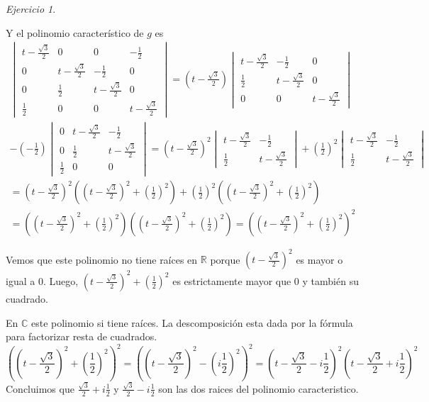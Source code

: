 \documentclass[11pt,a4paper]{article}
\theoremstyle{definition}
\theoremstyle{remark}
\newtheorem{exc}{Ejercicio}
\begin{document}
\begin{exc}
\begin{enumerate}
	Y el polinomio característico de $ g $ es
	\begin{multline}
	\begin{vmatrix}
	t-\frac{\sqrt{3}}{2} & 0 & 0 & -\frac{1}{2}
		\\ 0 & t-\frac{\sqrt{3}}{2} & -\frac{1}{2} & 0 
		\\ 0 & \frac{1}{2} & t-\frac{\sqrt{3}}{2} & 0
		\\ \frac{1}{2} & 0 & 0 & t-\frac{\sqrt{3}}{2}
	\end{vmatrix}\nonumber = (t- \frac{\sqrt{3}}{2})
	\begin{vmatrix}
			 t-\frac{\sqrt{3}}{2} & -\frac{1}{2} & 0 
			\\\frac{1}{2} & t-\frac{\sqrt{3}}{2} & 0
			\\0 & 0 & t-\frac{\sqrt{3}}{2}
		\end{vmatrix} \\
		-(-\frac{1}{2})\begin{vmatrix}
			0 & t-\frac{\sqrt{3}}{2} & -\frac{1}{2}
				\\ 0 & \frac{1}{2} & t-\frac{\sqrt{3}}{2}
				\\ \frac{1}{2} & 0 & 0
			\end{vmatrix}\nonumber = (t-\frac{\sqrt{3}}{2})^2\begin{vmatrix}
						 t-\frac{\sqrt{3}}{2} & -\frac{1}{2}
						\\\frac{1}{2} & t-\frac{\sqrt{3}}{2}
					\end{vmatrix}+(\frac{1}{2})^2\begin{vmatrix}
								t-\frac{\sqrt{3}}{2} & -\frac{1}{2}
									\\ \frac{1}{2} & t-\frac{\sqrt{3}}{2}
								\end{vmatrix}
	\\=(t-\frac{\sqrt{3}}{2})^2((t-\frac{\sqrt{3}}{2})^2+(\frac{1}{2})^2)+(\frac{1}{2})^2((t-\frac{\sqrt{3}}{2})^2+(\frac{1}{2})^2)
	\\=((t-\frac{\sqrt{3}}{2})^2+(\frac{1}{2})^2)((t-\frac{\sqrt{3}}{2})^2+(\frac{1}{2})^2)=((t-\frac{\sqrt{3}}{2})^2+(\frac{1}{2})^2)^2
	\end{multline}
	
	Vemos que este polinomio no tiene raíces en $ \mathbb{R} $ porque $ (t-\frac{\sqrt{3}}{2})^2 $ es mayor o igual a 0. Luego, $ (t-\frac{\sqrt{3}}{2})^2 + (\frac{1}{2})^2$ es estrictamente mayor que 0 y también su cuadrado.
	
    En $ \mathbb{C} $ este polinomio si tiene raíces. La descomposición esta dada por la fórmula para factorizar resta de cuadrados.
    \begin{equation}
    ((t-\frac{\sqrt{3}}{2})^2+(\frac{1}{2})^2)^2=((t-\frac{\sqrt{3}}{2})^2-(i\frac{1}{2})^2)^2=(t-\frac{\sqrt{3}}{2}-i\frac{1}{2})^2(t-\frac{\sqrt{3}}{2}+i\frac{1}{2})^2\nonumber
    \end{equation}
    Concluimos que $ \frac{\sqrt{3}}{2}+i\frac{1}{2} $ y $ \frac{\sqrt{3}}{2}-i\frac{1}{2} $ son las dos raices del polinomio caracteristico.
    

\end{enumerate}
\end{exc}
\end{document}
